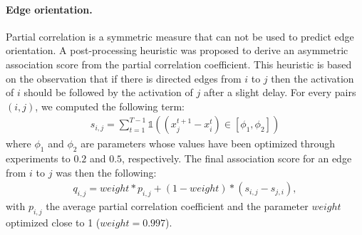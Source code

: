 \documentclass[wcp]{jmlr}
\begin{document}
\paragraph{Edge orientation.}
Partial correlation is a symmetric measure that can not be used to predict edge
orientation. A post-processing heuristic was proposed to derive an asymmetric
association score from the partial correlation coefficient. This heuristic is
based on the observation that if there is directed edges from $i$ to $j$ then
the activation of $i$ should be followed by the activation of $j$ after a
slight delay. For every pairs $(i,j)$, we computed the following term:
\begin{align}
s_{i,j} = \sum_{t=1}^{T - 1} \mathbb{1}((x_j^{t+1} - x_i^t) \in \left[\phi_1, \phi_2\right])
\end{align}
where $\phi_1$ and $\phi_2$ are parameters whose values have been
optimized through experiments to $0.2$ and $0.5$, respectively. The
final association score for an edge from $i$ to $j$ was
then the following:
\begin{align}
q_{i,j} = weight * p_{i,j} + (1-weight) * (s_{i,j}-s_{j,i}),
\label{eqn:qij}
\end{align}
with $p_{i,j}$ the average partial correlation coefficient and the parameter
$weight$ optimized close to 1 ($weight=0.997$). 
\newpage

\end{document}
